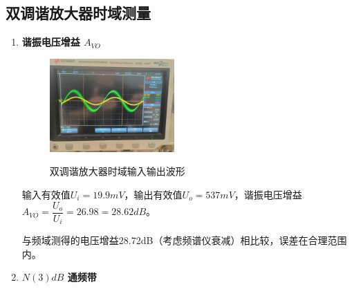 \documentclass[UTF8]{ctexart}
\begin{document}
\subsection{双调谐放大器时域测量}
\begin{enumerate}[(1)]
    \item \noindent\textbf{谐振电压增益 $A_{VO}$}
    
    \begin{figure}[H]
        \centering
        \includegraphics[width=0.45\textwidth]{pics/3.4.1.png}
        ~\\
        \caption{双调谐放大器时域输入输出波形}\label{fig:3.4.1}
    \end{figure}

    
    输入有效值$U_i=19.9mV$，输出有效值$U_o=537mV$，谐振电压增益 $A_{VO}=\dfrac{U_o}{U_i}=26.98=28.62dB$。
    
    与频域测得的电压增益28.72dB（考虑频谱仪衰减）相比较，误差在合理范围内。
    \item \noindent\textbf{$N(3)dB$ 通频带}


\end{enumerate}
\end{document}
